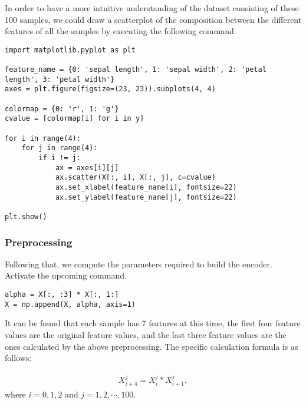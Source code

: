 In order to have a more intuitive understanding of the dataset consisting of these 100 samples, we could draw a scatterplot of the composition between the different features of all the samples by executing the following command.

\begin{lstlisting}
import matplotlib.pyplot as plt

feature_name = {0: 'sepal length', 1: 'sepal width', 2: 'petal length', 3: 'petal width'}
axes = plt.figure(figsize=(23, 23)).subplots(4, 4)

colormap = {0: 'r', 1: 'g'}
cvalue = [colormap[i] for i in y]

for i in range(4):
    for j in range(4):
        if i != j:
            ax = axes[i][j]
            ax.scatter(X[:, i], X[:, j], c=cvalue)
            ax.set_xlabel(feature_name[i], fontsize=22)
            ax.set_ylabel(feature_name[j], fontsize=22)

plt.show()
\end{lstlisting}



\subsubsection{Preprocessing}
Following that, we compute the parameters required to build the encoder.  Activate the upcoming command.

\begin{lstlisting}
alpha = X[:, :3] * X[:, 1:]
X = np.append(X, alpha, axis=1)
\end{lstlisting}

It can be found that each sample has 7 features at this time, the first four feature values are the original feature values, and the last three feature values are the ones calculated by the above preprocessing. The specific calculation formula is as follows:

\begin{eqnarray}\label{5.1dataprocessing}
    X_{i+4}^{j} = X_{i}^{j} * X_{i+1}^{j},
\end{eqnarray}
where $i = 0, 1, 2$ and $j = 1, 2, \cdots, 100$.

